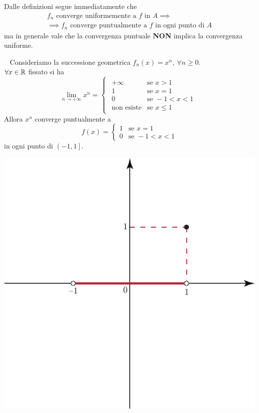 Dalle definizioni segue immediatamente che
	\begin{multline}
	f_n\text{ converge uniformemente a }f\text{ in }A\implies\\
	\implies f_n\text{ converge puntualmente a }f\text{ in ogni punto di }A
\end{multline}
ma in generale vale che la convergenza puntuale \textbf{NON} implica la convergenza uniforme.
\begin{example}~{}
	Consideriamo la successione geometrica $f_n\left(x\right)=x^n,\ \forall n\geq 0$.\\
	$\forall x\in\mathbb{R}$ fissato si ha
	\begin{equation*}
		\lim_{n\to+\infty}x^n=
		\begin{cases}
			\begin{array}{ll}
				+\infty&\text{se }x>1\\
				1&\text{se }x=1\\
				0&\text{se }-1<x<1\\
				\text{non esiste}&\text{se }x\leq 1
			\end{array}
		\end{cases}
	\end{equation*}
Allora $x^n$ converge puntualmente a
\begin{equation*}
	f\left(x\right)=
	\begin{cases}
	1&\text{se }x=1\\
	0&\text{se }-1<x<1	
	\end{cases}
\end{equation*}
in ogni punto di $\left(-1,1\right]$.
\begin{center}
	\includegraphics[trim=0cm 4cm 0cm 0cm, clip, scale=0.65]{images/grafico4.pdf}
\end{center}
\end{example}

